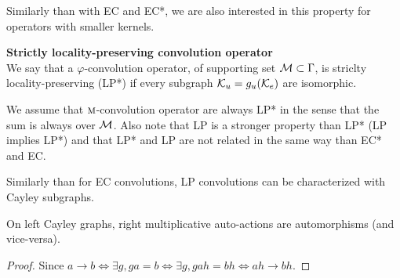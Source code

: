 Similarly than with EC and EC*, we are also interested in this property for operators with smaller kernels.

\begin{definition}\textbf{Strictly locality-preserving convolution operator}\\
We say that a $\varphi$-convolution operator, of supporting set $\mathcal{M} \subset \Gamma$, is striclty locality-preserving (LP*) if every subgraph  $\mathcal{K}_u = g_u(\mathcal{K}_e)$ are isomorphic.
\end{definition}

\begin{remark}
We assume that $\operatorname{\textsc{m}}$-convolution operator are always LP* in the sense that the sum is always over $\mathcal{M}$. Also note that LP is a stronger property than LP* (\ie LP implies LP*) and that LP* and LP are not related in the same way than EC* and EC.
\end{remark}

Similarly than for EC convolutions, LP convolutions can be characterized with Cayley subgraphs.

\begin{lemma}
On left Cayley graphs, right multiplicative auto-actions are automorphisms (and vice-versa).
\label{lem:lat}
\end{lemma}
\begin{proof}
Since $a \rightarrow b \Leftrightarrow \exists g, ga = b \Leftrightarrow \exists g, gah = bh \Leftrightarrow ah \rightarrow bh$.
\end{proof}

